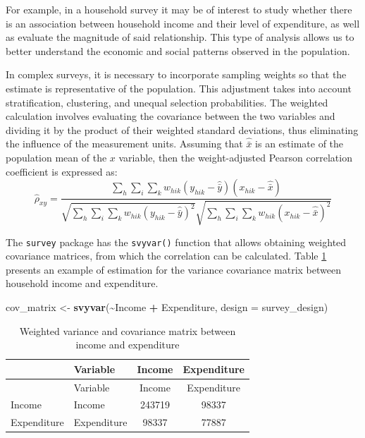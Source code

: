 \documentclass[
  english,
  12pt,
]{book}
\newenvironment{Shaded}{\begin{snugshade}}{\end{snugshade}}
\newcommand{\AttributeTok}[1]{\textcolor[rgb]{0.13,0.29,0.53}{#1}}
\newcommand{\FunctionTok}[1]{\textcolor[rgb]{0.13,0.29,0.53}{\textbf{#1}}}
\newcommand{\NormalTok}[1]{#1}
\newcommand{\OtherTok}[1]{\textcolor[rgb]{0.56,0.35,0.01}{#1}}
\newcommand{\SpecialCharTok}[1]{\textcolor[rgb]{0.81,0.36,0.00}{\textbf{#1}}}
\begin{document}
For example, in a household survey it may be of interest to study whether there is an association between household income and their level of expenditure, as well as evaluate the magnitude of said relationship. This type of analysis allows us to better understand the economic and social patterns observed in the population.

In complex surveys, it is necessary to incorporate sampling weights so that the estimate is representative of the population. This adjustment takes into account stratification, clustering, and unequal selection probabilities. The weighted calculation involves evaluating the covariance between the two variables and dividing it by the product of their weighted standard deviations, thus eliminating the influence of the measurement units. Assuming that \(\hat{\bar{x}}\) is an estimate of the population mean of the \(x\) variable, then the weight-adjusted Pearson correlation coefficient is expressed as:
\[
\hat{\rho}_{xy} = \frac{\displaystyle \sum_{h} \sum_{i} \sum_{k} w_{hik} (y_{hik} - \hat{\bar{y}})(x_{hik} - \hat{\bar{x}})} {\sqrt{\displaystyle \sum_{h} \sum_{i} \sum_{k} w_{hik} (y_{hik} - \hat{\bar{y}})^2} \sqrt{\displaystyle \sum_{h} \sum_{i} \sum_{k} w_{hik} (x_{hik} - \hat{\bar{x}})^2}}
\]

The \texttt{survey} package has the \texttt{svyvar()} function that allows obtaining weighted covariance matrices, from which the correlation can be calculated. Table \ref{tab:tab-covarianza} presents an example of estimation for the variance covariance matrix between household income and expenditure.

\begin{Shaded}
\begin{Highlighting}[]
\NormalTok{cov\_matrix }\OtherTok{\textless{}{-}} \FunctionTok{svyvar}\NormalTok{(}\SpecialCharTok{\textasciitilde{}}\NormalTok{Income }\SpecialCharTok{+}\NormalTok{ Expenditure, }\AttributeTok{design =}\NormalTok{ survey\_design)}
\end{Highlighting}
\end{Shaded}

\begin{longtable}[]{@{}llcc@{}}
\caption{\label{tab:tab-covarianza}Weighted variance and covariance matrix between income and expenditure}\tabularnewline
\toprule\noalign{}
& Variable & Income & Expenditure \\
\midrule\noalign{}
\endfirsthead
\toprule\noalign{}
& Variable & Income & Expenditure \\
\midrule\noalign{}
\endhead
\bottomrule\noalign{}
\endlastfoot
Income & Income & 243719 & 98337 \\
Expenditure & Expenditure & 98337 & 77887 \\
\end{longtable}
\end{document}
